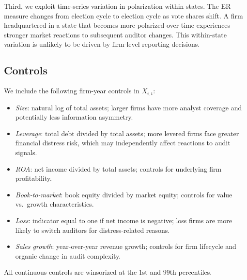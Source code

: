 Third, we exploit time-series variation in polarization within states. The ER
measure changes from election cycle to election cycle as vote shares shift. A
firm headquartered in a state that becomes more polarized over time experiences
stronger market reactions to subsequent auditor changes. This within-state
variation is unlikely to be driven by firm-level reporting decisions.

\subsection{Controls}

We include the following firm-year controls in $X_{i,t}$:
\begin{itemize}
    \item \textit{Size}: natural log of total assets; larger firms have more
          analyst coverage and potentially less information asymmetry.
    \item \textit{Leverage}: total debt divided by total assets; more
          levered firms face greater financial distress risk, which may
          independently affect reactions to audit signals.
    \item \textit{ROA}: net income divided by total assets; controls for
          underlying firm profitability.
    \item \textit{Book-to-market}: book equity divided by market equity;
          controls for value vs.\ growth characteristics.
    \item \textit{Loss}: indicator equal to one if net income is negative;
          loss firms are more likely to switch auditors for distress-related
          reasons.
    \item \textit{Sales growth}: year-over-year revenue growth; controls
          for firm lifecycle and organic change in audit complexity.
\end{itemize}
All continuous controls are winsorized at the 1st and 99th percentiles.
